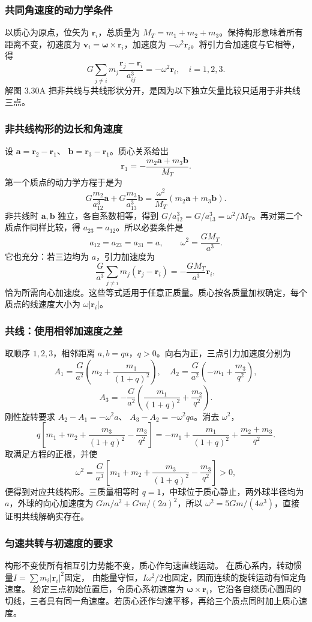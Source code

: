\documentclass[UTF8,fontset=fandol,a4paper,11pt]{ctexart}
\newcommand{\vect}[1]{\bm{#1}}
\begin{document}
\subsubsection*{共同角速度的动力学条件}
以质心为原点，位矢为 $\vect r_i$，总质量为 $M_T=m_1+m_2+m_3$。保持构形意味着所有距离不变，初速度为 $\vect v_i=\vect\omega\times\vect r_i$，加速度为 $-\omega^2\vect r_i$。将引力合加速度与它相等，得
\[
G\sum_{j\ne i}m_j
\frac{\vect r_j-\vect r_i}{a_{ij}^3}
=-\omega^2\vect r_i,\quad i=1,2,3.
\]
解图 3.30A 把非共线与共线形状分开，是因为以下独立矢量比较只适用于非共线三点。

\subsubsection*{非共线构形的边长和角速度}
设 $\vect a=\vect r_2-\vect r_1$、
$\vect b=\vect r_3-\vect r_1$。质心关系给出
\[
\vect r_1=-\frac{m_2\vect a+m_3\vect b}{M_T}.
\]
第一个质点的动力学方程于是为
\[
G\frac{m_2}{a_{12}^3}\vect a+
G\frac{m_3}{a_{13}^3}\vect b
=\frac{\omega^2}{M_T}(m_2\vect a+m_3\vect b).
\]
非共线时 $\vect a,\vect b$ 独立，各自系数相等，得到
$G/a_{12}^3=G/a_{13}^3=\omega^2/M_T$。再对第二个质点作同样比较，得 $a_{23}=a_{12}$。所以必要条件是
\[
\boxed{a_{12}=a_{23}=a_{31}=a,\qquad
\omega^2=\frac{GM_T}{a^3}}.
\]
它也充分：若三边均为 $a$，引力加速度为
\[
\frac G{a^3}\sum_{j\ne i}m_j(\vect r_j-\vect r_i)
=-\frac{GM_T}{a^3}\vect r_i,
\]
恰为所需向心加速度。这些等式适用于任意正质量。质心按各质量加权确定，每个质点的线速度大小为 $\omega|\vect r_i|$。

\subsubsection*{共线：使用相邻加速度之差}
取顺序 $1,2,3$，相邻距离 $a,b=qa$，$q>0$。向右为正，三点引力加速度分别为
\[
A_1=\frac G{a^2}\left(m_2+\frac{m_3}{(1+q)^2}\right),
\quad
A_2=\frac G{a^2}\left(-m_1+\frac{m_3}{q^2}\right),
\]
\[
A_3=-\frac G{a^2}\left(\frac{m_1}{(1+q)^2}
+\frac{m_2}{q^2}\right).
\]
刚性旋转要求 $A_2-A_1=-\omega^2a$、
$A_3-A_2=-\omega^2qa$。消去 $\omega^2$，
\[
q\left[m_1+m_2+\frac{m_3}{(1+q)^2}
-\frac{m_3}{q^2}\right]
=-m_1+\frac{m_1}{(1+q)^2}+\frac{m_2+m_3}{q^2}.
\]
取满足方程的正根，并使
\[
\omega^2=\frac G{a^3}\left[m_1+m_2+
\frac{m_3}{(1+q)^2}-\frac{m_3}{q^2}\right]>0,
\]
便得到对应共线构形。三质量相等时 $q=1$，中球位于质心静止，两外球半径均为 $a$，外球的向心加速度为 $Gm/a^2+Gm/(2a)^2$，所以
$\omega^2=5Gm/(4a^3)$，直接证明共线解确实存在。


\subsubsection*{匀速共转与初速度的要求}
构形不变使所有相互引力势能不变，质心作匀速直线运动。
在质心系内，转动惯量$I=\sum m_i|\vect r_i|^2$固定，
由能量守恒，$I\omega^2/2$也固定，因而连续的旋转运动有恒定角速度。
给定三点初始位置后，令质心系初速度为 $\vect\omega\times\vect r_i$，它沿各自绕质心圆周的切线，三者具有同一角速度。若质心还作匀速平移，再给三个质点同时加上质心速度。
\end{document}
